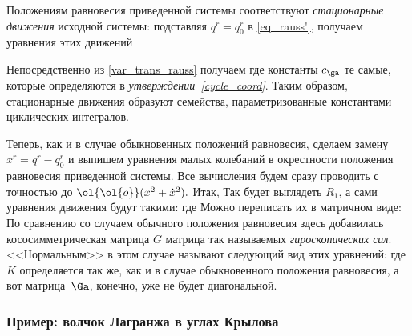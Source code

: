 \documentclass[a4paper,12pt]{article}
\newcommand{\tdf}[1]{\textsl{#1}}
\newcommand{\tstm}[1]{\emph{#1}}
\renewcommand\o{\ol{\ol{o}}}
\begin{document}
\begin{df}
Положениям равновесия приведенной системы соответствуют
\tdf{стационарные движения} исходной системы:  подставляя
$q^r=q^r_0$ в \eqref{eq_rauss'}, получаем уравнения этих
движений
\end{df}

\begin{note}
Непосредственно из \eqref{var_trans_rauss} получаем
 где константы $c_{\ga}$ те
самые, которые определяются в \tstm{утверждении~\ref{cycle_coord}}. Таким
образом, стационарные движения образуют семейства, параметризованные
константами циклических интегралов.
\end{note}

Теперь, как и в случае обыкновенных положений равновесия, сделаем
замену $x^r=q^r-q^r_0$ и выпишем уравнения малых колебаний в
окрестности положения равновесия приведенной системы. Все вычисления
будем сразу проводить с точностью до $\o(x^2+\dot{x}^2).$ Итак,
 Так будет
выглядеть $R_1$, а сами уравнения движения будут такими:
где
Можно переписать их в матричном виде:
По сравнению со случаем обычного положения равновесия здесь
добавилась кососимметрическая матрица $G$ матрица так называемых
\tdf{гироскопических сил}. <<Нормальным>> в этом случае называют
следующий вид этих уравнений: 
где $K$ определяется так же, как и в случае обыкновенного положения
равновесия, а вот матрица~$\Ga$, конечно, уже не будет диагональной.

\subsubsection{Пример: волчок Лагранжа в углах Крылова}
\end{document}
